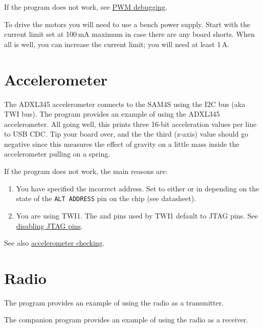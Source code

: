 If the program does not work, see  \hyperref[debugging-pwm]{PWM debugging}.

To drive the motors you will need to use a bench power supply. Start
with the current limit set at 100\,mA maximum in case there are any
board shorts.  When all is well, you can increase the current limit;
you will need at least 1\,A.

\section{Accelerometer}
\label{accelerometer-test}

The ADXL345 accelerometer connects to the SAM4S using the I2C bus (aka
TWI bus).  The program
 provides
an example of using the ADXL345 accelerometer.  All going well, this
prints three 16-bit acceleration values per line to USB CDC. Tip your
board over, and the the third (z-axis) value should go negative since
this measures the effect of gravity on a little mass inside the
accelerometer pulling on a spring.

If the program does not work, the main reasons are:

\begin{enumerate}
\item
  You have specified the incorrect address.  Set
   to either  or  in
   depending on the state of the \verb|ALT ADDRESS| pin
  on the chip (see datasheet).
\item
  You are using TWI1. The  and  pins used by TWI1
  default to JTAG pins. See
  \protect\hyperref[disabling-jtag-pins]{disabling JTAG pins}.
\end{enumerate}
%
See also \protect\hyperref[checking-accelerometer]{accelerometer checking}.


\section{Radio}
\label{radio-test}

The program  provides
an example of using the radio as a transmitter.

The companion program
 provides an example
of using the radio as a receiver.

\inputminted{C}{../../src/test-apps/radio_rx_test1/radio_rx_test1.c}


